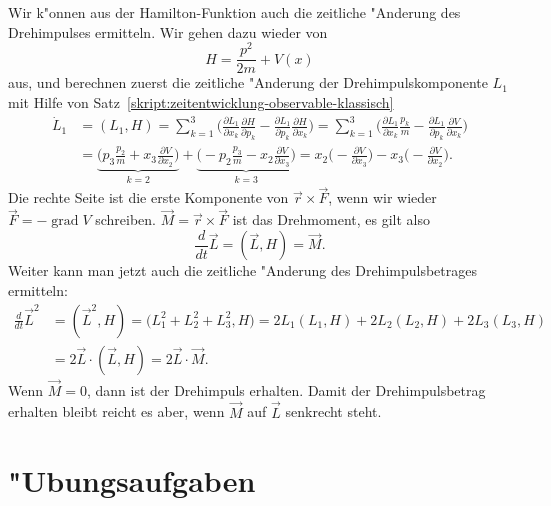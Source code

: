 Wir k"onnen aus der Hamilton-Funktion auch die zeitliche "Anderung des
Drehimpulses ermitteln. Wir gehen dazu wieder von 
\[
H=\frac{p^2}{2m}+V(x)
\]
aus, und berechnen zuerst die zeitliche "Anderung der Drehimpulskomponente
$L_1$ mit Hilfe von Satz~\ref{skript:zeitentwicklung-observable-klassisch}
\begin{align*}
\dot L_1
&=
(L_1,H)
=
\sum_{k=1}^3\biggl(
\frac{\partial L_1}{\partial x_k}\frac{\partial H}{\partial p_k}
-
\frac{\partial L_1}{\partial p_k}\frac{\partial H}{\partial x_k}
\biggr)
=
\sum_{k=1}^3\biggl(
\frac{\partial L_1}{\partial x_k}\frac{p_k}m
-
\frac{\partial L_1}{\partial p_k}\frac{\partial V}{\partial x_k}
\biggr)
\\
&=
\underbrace{
\biggl(
p_3
\frac{p_2}{m}
+
x_3
\frac{\partial V}{\partial x_2}
\biggr)
}_{k=2}
+
\underbrace{
\biggl(
-p_2\frac{p_3}{m}
-
x_2
\frac{\partial V}{\partial x_3}
\biggr)
}_{k=3}
=
x_2\biggl(-\frac{\partial V}{\partial x_3}\biggr)
-
x_3\biggl(-\frac{\partial V}{\partial x_2}\biggr).
\end{align*}
Die rechte Seite ist die erste Komponente von $\vec r\times \vec F$, wenn
wir wieder $\vec F=-\operatorname{grad}V$ schreiben.
$\vec M=\vec r\times\vec F$ ist das Drehmoment, es gilt also
\[
\frac{d}{dt} \vec L=(\vec L,H)= \vec M.
\]
Weiter kann man jetzt auch die zeitliche "Anderung des Drehimpulsbetrages
ermitteln:
\begin{align*}
\frac{d}{dt}\vec L^2
&=
(\vec L^2,H)
=
\bigl( L_1^2+L_2^2+L_3^2,H)
=
2L_1(L_1,H)
+
2L_2(L_2,H)
+
2L_3(L_3,H)
\\
&=
2\vec L\cdot(\vec L,H)=2\vec L\cdot\vec M.
\end{align*}
Wenn $\vec M=0$, dann ist der Drehimpuls erhalten. Damit der Drehimpulsbetrag
erhalten bleibt reicht es aber, wenn $\vec M$ auf $\vec L$ senkrecht steht.

\section*{"Ubungsaufgaben}
\begin{uebungsaufgaben}
\item

\item

\item

\end{uebungsaufgaben}

